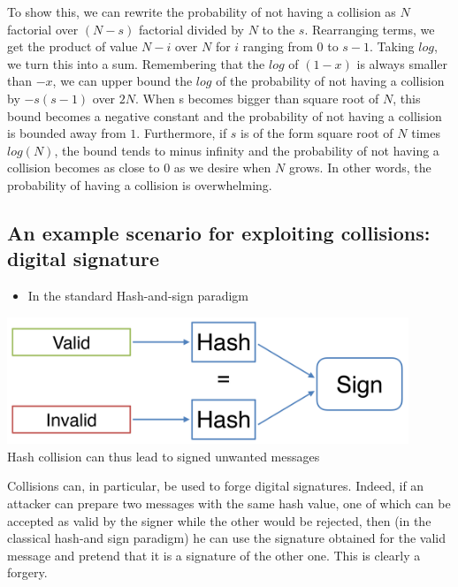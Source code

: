 		To show this, we can rewrite the probability of not having a collision as $N$ factorial over $(N-s)$ factorial divided by $N$ to the $s$. 
		Rearranging terms, we get the product of value $N-i$ over $N$ for $i$ ranging from $0$ to $s-1$. 
		Taking $log$, we turn this into a sum. 
		Remembering that the $log$ of $(1-x)$ is always smaller than $-x$, we can upper bound the $log$ of the probability of not having a collision by $-s(s-1)$ over $2N$. 
		When s becomes bigger than square root of $N$, this bound becomes a negative constant and the probability of not having a collision is bounded away from $1$. 
		Furthermore, if $s$ is of the form square root of $N$ times $log(N)$, the bound tends to minus infinity and the probability of not having 
		a collision becomes as close to $0$ as we desire when $N$ grows. 
		In other words, the probability of having a collision is overwhelming.
	
	\subsection{An example scenario for exploiting collisions: digital signature}
		\begin{itemize}
			\item In the standard Hash-and-sign paradigm
		\end{itemize}
		\begin{center}
			\includegraphics[width=120mm]{Graphics/Hash Functions/hf15.png}\\
			Hash collision can thus lead to signed unwanted messages
		\end{center}
		Collisions can, in particular, be used to forge digital signatures. 
		Indeed, if an attacker can prepare two messages with the same hash value, one of which can be accepted as valid by the signer while the other would be rejected, 
		then (in the classical hash-and sign paradigm) he can use the signature obtained for the valid message and pretend that it is a signature of the other one. 
		This is clearly a forgery.
	
